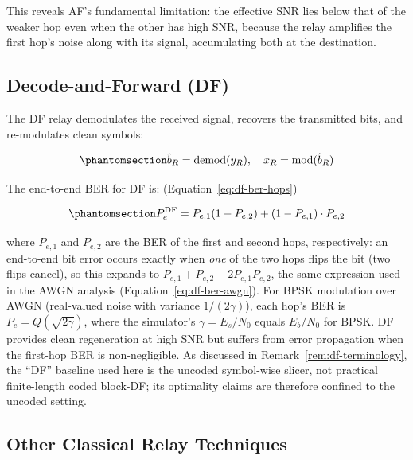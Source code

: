 This reveals AF's fundamental limitation: the effective SNR lies below that of the weaker hop even when the other has high SNR, because the relay amplifies the first hop's noise along with its signal, accumulating both at the destination.

\subsection{Decode-and-Forward (DF)}\label{sec:classical-relay-strategies-df}
The DF relay demodulates the received signal, recovers the transmitted bits, and re-modulates clean symbols:

\begin{equation}\protect\phantomsection\label{eq:df-demod-remod}{\hat{b}_R = \text{demod}(y_R), \quad x_R = \text{mod}(\hat{b}_R)
}\end{equation}

The end-to-end BER for DF is: (Equation~\ref{eq:df-ber-hops})

\begin{equation}\protect\phantomsection\label{eq:df-ber-hops}{P_e^{\text{DF}} = P_{e,1}(1 - P_{e,2}) + (1 - P_{e,1}) \cdot P_{e,2}
}\end{equation}

where \(P_{e,1}\) and \(P_{e,2}\) are the BER of the first and second hops, respectively: an end-to-end bit error occurs exactly when \emph{one} of the two hops flips the bit (two flips cancel), so this expands to \(P_{e,1} + P_{e,2} - 2P_{e,1}P_{e,2}\), the same expression used in the AWGN analysis (Equation~\ref{eq:df-ber-awgn}). For BPSK modulation over AWGN (real-valued noise with variance \(1/(2\gamma)\)), each hop's BER is \(P_e = Q\left(\sqrt{2\gamma}\right)\), where the simulator's \(\gamma = E_s/N_0\) equals \(E_b/N_0\) for BPSK. DF provides clean regeneration at high SNR but suffers from error propagation when the first-hop BER is non-negligible. As discussed in Remark~\ref{rem:df-terminology}, the ``DF'' baseline used here is the uncoded symbol-wise slicer, not practical finite-length coded block-DF; its optimality claims are therefore confined to the uncoded setting.

\subsection{Other Classical Relay Techniques}

